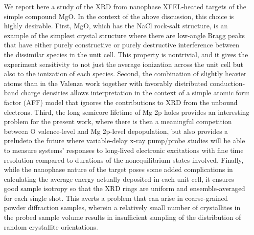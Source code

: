 We report here a study of the XRD from nanophase XFEL-heated targets of
the simple compound MgO. In the context of the above discussion, this
choice is highly desirable. First, MgO, which has the NaCl rock-salt
structure, is an example of the simplest crystal structure where there
are low-angle Bragg peaks that have either purely constructive or purely
destructive interference between the dissimilar species in the unit
cell. This property is nontrivial, and it gives the experiment
sensitivity to not just the average ionization across the unit cell but
also to the ionization of each species. Second, the combination of
slightly heavier atoms than in the Valenza \cite{VALENZA2016WARM} work together with
favorably distributed conduction-band charge densities allows
interpretation in the context of a simple atomic form factor (AFF) model
that ignores the contributions to XRD from the unbound electrons. Third,
the long semicore lifetime of Mg 2p holes provides an interesting
problem for the present work, where there is then a meaningful
competition between O valence-level and Mg 2p-level depopulation, but
also provides a preludeto the future where variable-delay x-ray
pump/probe studies will be able to measure systems' responses to
long-lived electronic excitations with fine time resolution compared to
durations of the nonequilibrium states involved. Finally, while the
nanophase nature of the target poses some added complications in
calculating the average energy actually deposited in each unit cell, it
ensures good sample isotropy so that the XRD rings are uniform and
ensemble-averaged for each single shot. This averts a problem that can
arise in coarse-grained powder diffraction samples, wherein a relatively
small number of crystallites in the probed sample volume results in
insufficient sampling of the distribution of random crystallite
orientations.


